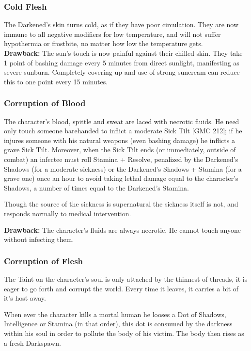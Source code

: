 \subsubsection*{Cold Flesh}
The Darkened’s skin turns cold, as if they have poor circulation. They are now immune to all negative modifiers for low temperature, and will not suffer hypothermia or frostbite, no matter how low the temperature gets. \\

\noindent \textbf{Drawback:} The sun’s touch is now painful against their chilled skin. They take 1 point of bashing damage every 5 minutes from direct sunlight, manifesting as severe sunburn. Completely covering up and use of strong suncream can reduce this to one point every 15 minutes. 

\subsubsection*{Corruption of Blood}

The character’s blood, spittle and sweat are laced with necrotic fluids. He need only touch someone barehanded to inflict a moderate Sick Tilt [GMC 212]; if he injures someone with his natural weapons (even bashing damage) he inflicts a grave Sick Tilt. Moreover, when the Sick Tilt ends (or immediately, outside of combat) an infectee must roll Stamina + Resolve, penalized by the Darkened’s Shadows (for a moderate sickness) or the Darkened's Shadows + Stamina (for a grave one) once an hour to avoid taking lethal damage equal to the character’s Shadows, a number of times equal to the Darkened's Stamina.

Though the source of the sickness is supernatural the sickness itself is not, and responds normally to medical intervention. 

\noindent \textbf{Drawback:} The character’s fluids are always necrotic. He cannot touch anyone without infecting them.

\subsubsection*{Corruption of Flesh}

The Taint on the character’s soul is only attached by the thinnest of threads, it is eager to go forth and corrupt the world. Every time it leaves, it carries a bit of it's host away. 

When ever the character kills a mortal human he looses a Dot of Shadows, Intelligence or Stamina (in that order), this dot is consumed by the darkness within his soul in order to pollute the body of his victim. The body then rises as a fresh Darkspawn. 

